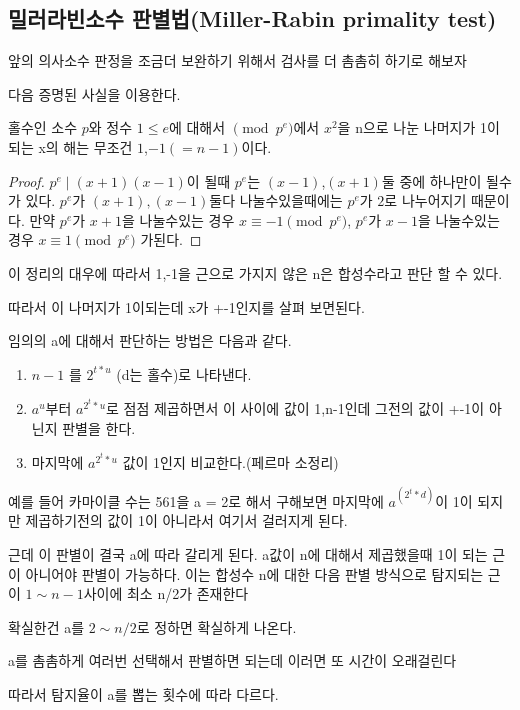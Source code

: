 \subsection{밀러라빈소수 판별법(Miller-Rabin primality test)}

앞의 의사소수 판정을 조금더 보완하기 위해서 검사를 더 촘촘히 하기로 해보자

다음 증명된 사실을 이용한다.

\begin{theorem}
    홀수인 소수 $p$와 정수 $1 \le e$에 대해서 $\pmod{p^e} $에서 $x^2$을 n으로 나눈 나머지가 1이 되는 x의 해는 무조건 $1$,$-1(=n-1)$이다.
\end{theorem}

\begin{proof}
    $p^e \mid (x+1)(x-1)$이 될때 $p^e$는 $(x-1)$,$(x+1)$둘 중에 하나만이 될수가 있다. $p^e$가 $(x+1), (x-1)$둘다 나눌수있을때에는 $p^e$가 $2$로 나누어지기 때문이다. 만약 $p^e$가 $x+1$을 나눌수있는 경우 $x \equiv -1 \pmod{p^e}$, $p^e$가 $x-1$을 나눌수있는 경우 $x \equiv 1 \pmod{p^e}$ 
    가된다.
\end{proof}
이 정리의 대우에 따라서 1,-1을 근으로 가지지 않은 n은 합성수라고 판단 할 수 있다.

따라서 이 나머지가 1이되는데 x가 +-1인지를 살펴 보면된다.

임의의 a에 대해서 판단하는 방법은 다음과 같다.
\begin{enumerate}
    \item $n-1$ 를  $2^{t*u}$ (d는 홀수)로 나타낸다.
    \item $a^u$부터 $a^{2^t*u}$로 점점 제곱하면서 이 사이에 값이 1,n-1인데 그전의 값이 +-1이 아닌지 판별을 한다.
    \item 마지막에 $a^{2^t*u}$ 값이 1인지 비교한다.(페르마 소정리)
\end{enumerate}

예를 들어 카마이클 수는 561을 a = 2로 해서 구해보면
마지막에 $a^(2^t*d)$이 1이 되지만 제곱하기전의 값이 1이 아니라서 여기서 걸러지게 된다.

근데 이 판별이 결국 a에 따라 갈리게 된다. a값이 n에 대해서 제곱했을때 1이 되는 근이 아니어야 판별이 가능하다. 이는 합성수 n에 대한 다음 판별 방식으로 탐지되는 근이 $1 \sim n-1$사이에 최소 n/2가 존재한다

확실한건 a를 $2 \sim n/2$로 정하면 확실하게 나온다.


a를 촘촘하게 여러번 선택해서 판별하면 되는데 이러면 또 시간이 오래걸린다

따라서 탐지율이 a를 뽑는 횟수에 따라 다르다.

